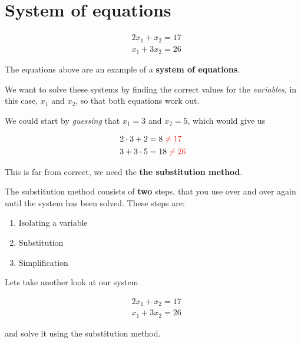 \documentclass{article}
\begin{document}
\section{System of equations}

\begin{align*}
& 2x_1 + x_2 = 17\\
& x_1 + 3x_2 = 26
\end{align*}

The equations above are an example of a \textbf{system of equations}.

We want to solve these systems by finding the correct values for the \textit{variables}, in this case, $x_1$ and $x_2$, so that both equations work out.

We could start by \textit{guessing} that $x_1 = 3$ and $x_2 = 5$, which would give us 

\begin{align*}
& 2\cdot 3 + 2 = 8 \color{rooj} \neq 17\\
& \color{black} 3 + 3\cdot 5 = 18 \color{rooj} \neq 26 \color{black}
\end{align*}

This is far from correct, we need the \textbf{the substitution method}.

The substitution method consists of \textbf{two} steps, that you use over and over again until the system has been solved. These steps are:

\begin{enumerate}
\color{blou} \item Isolating a variable 
\color{rooj} \item Substitution 
\color{groen} \item Simplification
\end{enumerate}

Lets take another look at our system

\begin{align}
& 2x_1 + x_2 = 17\\ 
& x_1 + 3x_2 = 26 
\end{align}

and solve it using the substitution method.
\end{document}
